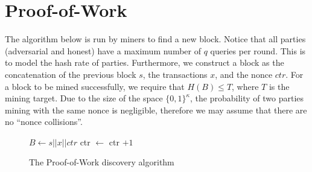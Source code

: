 \section{Proof-of-Work}
The algorithm below is run by miners to find a new block. Notice that all parties (adversarial and honest) have a maximum number of $q$ queries per round. This is to model the hash rate of parties. Furthermore, we construct a block as the concatenation of the previous block $s$, the transactions $x$, and the nonce $ctr$. For a block to be mined successfully, we require that $H(B) \leq T$, where $T$ is the mining target. Due to the size of the space $\{0, 1\}^{\kappa}$, the probability of two parties mining with the same nonce is negligible, therefore we may assume that there are no ``nonce collisions''.

\begin{figure}[H]
\begin{algorithm}[H]
    \caption{\label{alg.pow} The Proof-of-Work discovery algorithm}
    \begin{algorithmic}[1]
           
           
              \State $B \leftarrow s || x || ctr$ 
               
                  \State{}
              \EndIf
              \State ctr $\leftarrow$ ctr $+ 1$
          \EndFor
          \State\Return{$\bot$} 
      \EndFunction
    \end{algorithmic}
\end{algorithm}
\end{figure}

